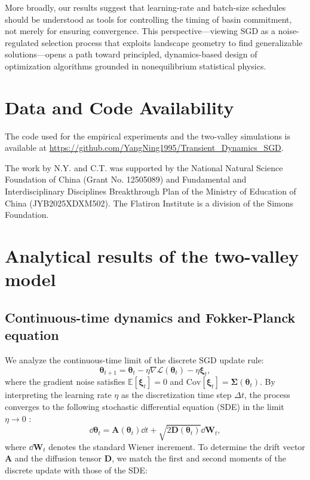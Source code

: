 \documentclass[aps,prx,reprint,superscriptaddress,longbibliography,nofootinbib,floatfix]{revtex4-2}
\begin{document}
More broadly, our results suggest that learning-rate and batch-size schedules should be understood as tools for controlling the timing of basin commitment, not merely for ensuring convergence. This perspective---viewing SGD as a noise-regulated selection process that exploits landscape geometry to find generalizable solutions---opens a path toward principled, dynamics-based design of optimization algorithms grounded in nonequilibrium statistical physics.

\section*{Data and Code Availability}
The code used for the empirical experiments and the two-valley simulations is available at
\url{https://github.com/YangNing1995/Transient_Dynamics_SGD}.

\begin{acknowledgments}
The work by N.Y. and C.T. was supported by the National Natural Science Foundation of China (Grant No. 12505089) and Fundamental and Interdisciplinary Disciplines Breakthrough Plan of the Ministry of Education of China (JYB2025XDXM502). The Flatiron Institute is a division of the Simons Foundation.
\end{acknowledgments}

\appendix

\setcounter{equation}{0}
\renewcommand{\theequation}{A\arabic{equation}}

\section{Analytical results of the two-valley model}

\subsection{Continuous-time dynamics and Fokker-Planck equation} \label{sec:appendix1}

We analyze the continuous-time limit of the discrete SGD update rule:
\begin{equation}
    \bm{\theta}_{t+1} = \bm{\theta}_t - \eta \nabla \mathcal{L}(\bm{\theta}_t) - \eta \bm{\xi}_t,
    \label{eq:si_sgd_update} 
\end{equation}
where the gradient noise satisfies $\mathbb{E}[\bm{\xi}_t] = 0$ and $\text{Cov}[\bm{\xi}_t] = \mathbf{\Sigma}(\bm{\theta}_t)$. By interpreting the learning rate $\eta$ as the discretization time step $\Delta t$, the process converges to the following stochastic differential equation (SDE) in the limit $\eta \to 0$ \cite{liHessianBasedAnalysis2020,liStochasticModifiedEquations2017}:
\begin{equation}
    \dd\bm{\theta}_t = \mathbf{A}(\bm{\theta}_t) \dd t + \sqrt{2\mathbf{D}(\bm{\theta}_t)} \dd \mathbf{W}_t,
    \label{eq:si_sde} 
\end{equation}
where $\dd \mathbf{W}_t$ denotes the standard Wiener increment. To determine the drift vector $\mathbf{A}$ and the diffusion tensor $\mathbf{D}$, we match the first and second moments of the discrete update with those of the SDE:
\end{document}
